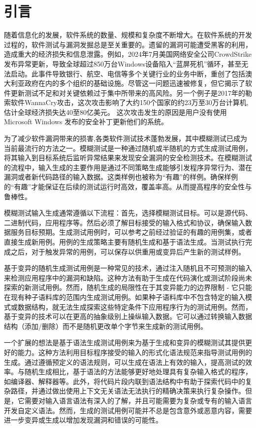 \documentclass[10.5pt,compsoc]{CjC}
\theoremstyle{mystyle}
\begin{document}
\section{引言}
\songti
随着信息化的发展，软件系统的数量、规模和复杂度不断增大。在软件系统的开发过程的，软件测试与漏洞发掘总是至关重要的。遗留的漏洞可能遭受黑客的利用，造成重大的经济损失和信息泄露。例如，2024年7月美国网络安全公司CrowdStrike发布异常更新，导致全球超过850万台Windows设备陷入“蓝屏死机”循环，甚至无法启动。此事件导致银行、航空、电信等多个关键行业的业务中断，重创了包括澳大利亚政府在内的多个组织的基础设施。尽管这一问题迅速被修复，但它揭示了软件更新测试不足和对关键依赖过于集中所带来的高风险\cite{Jones}。另一个例子是2017年的勒索软件WannaCry攻击，这次攻击影响了大约150个国家的约23万至30万台计算机,估计全球经济损失达40至80亿美元。 这次攻击发生的原因是用户没有使用 Microsoft Windows 发布的安全补丁更新他们的系统\cite{Maria}。

为了减少软件漏洞带来的损害,各类软件测试技术蓬勃发展，其中模糊测试已成为当前最流行的方法之一。模糊测试是一种通过随机或半随机的方式生成测试用例，将其输入到目标系统后监听异常结果来发现安全漏洞的安全检测技术。在模糊测试的流程中，输入生成的主要作用是通过不同策略生成能够引发程序异常行为、潜在漏洞或者新代码路径的输入数据。这类样例也被称为“有趣”的样例。确保样例的“有趣”才能保证在后续的测试运行时高效，覆盖率高。从而提高程序的安全性与鲁棒性。

模糊测试输入生成通常遵循以下流程：首先，选择模糊测试目标。可以是源代码、二进制代码，应用程序等。然后必须了解目标接受的输入格式和协议，确保输入数据服务目标预期。生成测试用例时，可以参考之前经过验证的有趣的用例集，或者直接生成新用例。用例的生成策略主要有随机生成和基于语法生成。当测试执行完成之后，对于触发异常的用例，可以保存以供重用或变异后产生新的测试样例。 

基于变异的随机生成测试用例\cite{LibFuzzer, Chenyang, Shuitao}是一种常见的技术，通过注入随机且不可预测的输入来检测应用程序中的漏洞和缺陷。这种方法有助于生成在代码演化或测试阶段尚未探索的新测试用例。然而，随机生成的局限性在于其变异能力的边界限制 - 它只能在现有种子语料库的范围内生成测试用例。如果种子语料库中不包含特定的输入模式或数据结构，就无法生成探索这些特定条件下应用程序行为的测试用例。然而，基于变异的技术可以在更高的抽象级别上操纵输入数据。它可以通过转换输入数据结构（添加/删除）而不是随机更改单个字节来生成新的测试用例。

一个扩展的想法是基于语法生成测试用例\cite{Cornelius, Martin}来为基于生成和变异的模糊测试其提供更好的能力。这种方法利用目标程序接受的输入的形式化语法规范来指导测试用例的生成。通过遵循预定义的语法规则，可以生成在语法上有效的输入，提高测试的效率。与随机生成相比，基于语法的方法能够更好地处理具有复杂输入格式的程序，如编译器、解释器等。此外，将代码片段内联到语法结构中有助于探索代码中的复杂路径，并通过做出使用上下文无关语法无法执行的精确决策来执行复杂操作。但是，它需要对输入语言语法有深入的了解，并且可能需要为复杂或专有的输入语言开发自定义语法。然而，生成的测试用例可能并不总是包含意外或恶意内容，需要进一步变异或生成以增加发现漏洞和错误的可能性。
\vspace {10mm}
\end{document}

